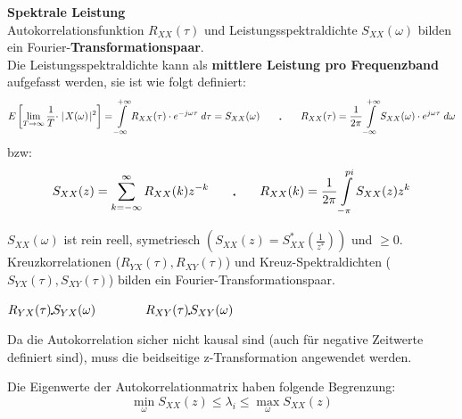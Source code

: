 \textbf{Spektrale Leistung}\\
Autokorrelationsfunktion $R_{XX}(\tau)$ und Leistungsspektraldichte $S_{XX}(\omega)$ bilden ein
Fourier-\textbf{Transformationspaar}. \\ Die Leistungsspektraldichte kann als \textbf{mittlere Leistung pro Frequenzband }aufgefasst werden, sie ist
wie folgt definiert:                             
        $$ E\left[ \lim\limits_{T \rightarrow \infty}
                                    \frac{1}{T} \cdot \mid\! X(\omega) \!\mid^{2}\right]                          
                            = \int\limits_{-\infty}^{+\infty} R_{XX}(\tau) \cdot e^{-j\omega\tau} \; d\tau 
                            = S_{XX}(\omega) \qquad \IFT \qquad
        R_{XX}(\tau)   = \frac{1}{2\pi} \int\limits_{-\infty}^{+\infty} 
                             S_{XX}(\omega) \cdot e^{j\omega\tau} \; d\omega$$ bzw:
                             $$S_{XX}(z) = \sum\limits_{k=-\infty}^{\infty} R_{XX}(k)z^{-k}\qquad \IFT \qquad 
                             R_{XX}(k)=\frac 1{2\pi} \int \limits_{-\pi}^{pi} S_{XX}(z)z^k$$
                             
$S_{XX}(\omega)$ ist rein reell, symetriesch $(S_{XX}(z)=S_{XX}^*(\frac{1}{z^*}))$ und $\geq 0$. \\
Kreuzkorrelationen ($R_{YX}(\tau), R_{XY}(\tau)$) und Kreuz-Spektraldichten ($S_{YX}(\tau),
S_{XY}(\tau)$) bilden ein Fourier-Transformationspaar.
\begin{center}
$ R_{YX}(\tau) \FT S_{YX}(\omega) \qquad \qquad R_{XY}(\tau) \FT S_{XY}(\omega)  $
\end{center}
Da die Autokorrelation sicher nicht kausal sind (auch für negative Zeitwerte definiert sind), muss die beidseitige z-Transformation angewendet werden.

Die Eigenwerte der Autokorrelationmatrix haben folgende Begrenzung:\\
$$\min\limits_\omega S_{XX}(z)\leq \lambda_i \leq \max\limits_{\omega}S_{XX}(z)$$

